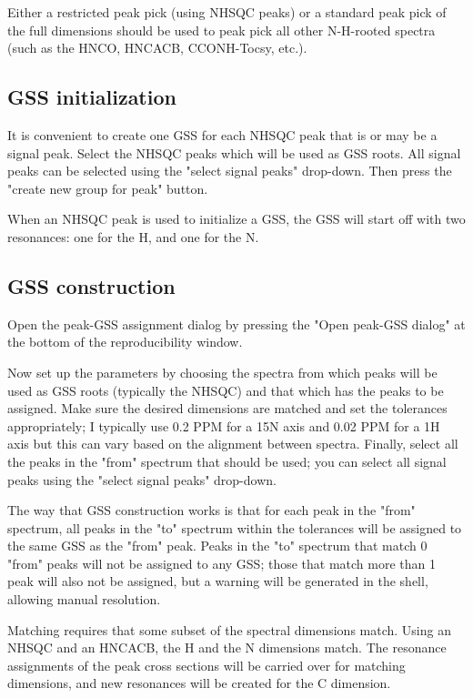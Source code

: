 Either a restricted peak pick (using NHSQC peaks) or a standard peak pick
of the full dimensions should be used to peak pick all other N-H-rooted
spectra (such as the HNCO, HNCACB, CCONH-Tocsy, etc.).

\subsection*{GSS initialization}
It is convenient to create one GSS for each NHSQC peak that is or may be
a signal peak.  Select the NHSQC peaks which will be used as GSS roots.  
All signal peaks can be selected using the "select signal peaks" drop-down.
Then press the "create new group for peak" button.

When an NHSQC peak is used to initialize a GSS, the GSS will start off
with two resonances: one for the H, and one for the N.

\subsection*{GSS construction}
Open the peak-GSS assignment dialog by pressing the "Open peak-GSS dialog"
at the bottom of the reproducibility window.

Now set up the parameters by choosing the spectra from which peaks will
be used as GSS roots (typically the NHSQC) and that which has the peaks to
be assigned.  Make sure the desired dimensions are matched and set the 
tolerances appropriately; I typically use 0.2 PPM for a 15N axis and 0.02 PPM
for a 1H axis but this can vary based on the alignment between spectra.
Finally, select all the peaks in the "from" spectrum that should be used;
you can select all signal peaks using the "select signal peaks" drop-down.

The way that GSS construction works is that for each peak in the "from"
spectrum, all peaks in the "to" spectrum within the tolerances will be
assigned to the same GSS as the "from" peak.  Peaks in the "to" spectrum that
match 0 "from" peaks will not be assigned to any GSS; those that match more
than 1 peak will also not be assigned, but a warning will be generated in
the shell, allowing manual resolution.

Matching requires that some subset of the spectral dimensions match.  Using
an NHSQC and an HNCACB, the H and the N dimensions match.  The resonance
assignments of the peak cross sections will be carried over for matching dimensions,
and new resonances will be created for the C dimension.

